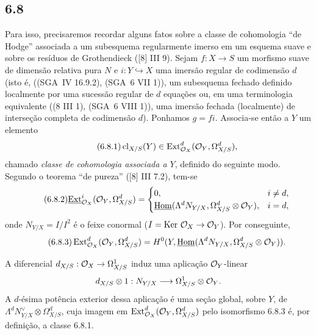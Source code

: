 \subsection*{6.8}
Para isso, precisaremos recordar alguns fatos sobre a classe de cohomologia ``de Hodge'' associada a um subesquema regularmente imerso em um esquema suave e sobre os resíduos de Grothendieck ([8] III 9). Sejam $f:X\to S$ um morfismo suave de dimensão relativa pura $N$ e $i:Y\hookrightarrow X$ uma imersão regular de codimensão $d$ (isto é, ((SGA~IV 16.9.2), (SGA~6 VII 1)), um subesquema fechado definido localmente por uma sucessão regular de $d$ equações ou, em uma terminologia equivalente ((8 III 1), (SGA~6 VIII 1)), uma imersão fechada (localmente) de interseção completa de codimensão $d$). Ponhamos $g=fi$. Associa-se então a $Y$ um elemento
\begin{equation}
\tag{6.8.1}
\operatorname{cl}_{X/S}(Y)\in\operatorname{Ext}^d_{\mathcal{O}_X}(\mathcal{O}_Y,\Omega^d_{X/S}),
\end{equation}
chamado \emph{classe de cohomologia associada a $Y$}, definido do seguinte modo. Segundo o teorema ``de pureza'' ([8] III 7.2), tem-se
\begin{equation}
\tag{6.8.2}
\underline{\operatorname{Ext}}^i_{\mathcal{O}_X}(\mathcal{O}_Y,\Omega^d_{X/S})=
\begin{cases}
0,& i\ne d,\\
\underline{\operatorname{Hom}}(\Lambda^d N_{Y/X},\Omega^d_{X/S}\otimes\mathcal{O}_Y),& i=d,
\end{cases}
\end{equation}
onde $N_{Y/X}=I/I^2$ é o feixe conormal ($I=\operatorname{Ker}\,\mathcal{O}_X\to\mathcal{O}_Y$). Por conseguinte,
\begin{equation}
\tag{6.8.3}
\operatorname{Ext}^d_{\mathcal{O}_X}(\mathcal{O}_Y,\Omega^d_{X/S})=H^0(Y,\underline{\operatorname{Hom}}(\Lambda^dN_{Y/X},\Omega^d_{X/S}\otimes\mathcal{O}_Y)).
\end{equation}

A diferencial $d_{X/S}:\mathcal{O}_X\to\Omega^1_{X/S}$ induz uma aplicação $\mathcal{O}_Y$-linear
\[
d_{X/S}\otimes 1:N_{Y/X}\longrightarrow \Omega^1_{X/S}\otimes\mathcal{O}_Y.
\]
A $d$-ésima potência exterior dessa aplicação é uma seção global, sobre $Y$, de $\Lambda^d N_{Y/X}^{\vee}\otimes\Omega^d_{X/S}$, cuja imagem em $\operatorname{Ext}^d_{\mathcal{O}_X}(\mathcal{O}_Y,\Omega^d_{X/S})$ pelo isomorfismo 6.8.3 é, por definição, a classe 6.8.1.

